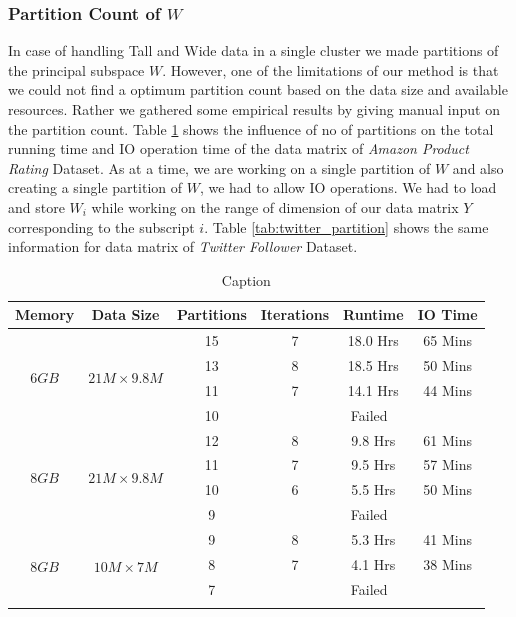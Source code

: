 \documentclass[10pt,conference,letterpaper]{IEEEtran}
\begin{document}
\subsubsection{Partition Count of $W$}
In case of handling Tall and Wide data in a single cluster we made partitions of the principal subspace $W$. However, one of the limitations of our method is that we could not find a optimum partition count based on the data size and available resources. Rather we gathered some empirical results by giving manual input on the partition count. Table \ref{tab:amazon_partition} shows the influence of no of partitions on the total running time and IO operation time of the data matrix of \textit{Amazon Product Rating} Dataset. As at a time, we are working on a single partition of $W$ and also creating a single partition of $W$, we had to allow IO operations. We had to load and store $W_i$ while working on 
the range of dimension of our data matrix $Y$ corresponding to the subscript $i$. Table \ref{tab:twitter_partition} shows the same information for data matrix of \textit{Twitter Follower} Dataset.

\begin{table}[!htbp]
    \centering
    \begin{tabular}{|c|c|c|c|c|c|}
    \hline
    Memory &Data Size &Partitions &Iterations &Runtime &IO Time \\
    \hline
    \multirow{4}{17pt}{$6GB$}  & \multirow{4}{7em}{$21M \times 9.8M$} &15  &7		&18.0 Hrs   	  &65 Mins\\
    \cline{3-6}
         & & 13 &8		&18.5 Hrs   	  &50 Mins\\
    \cline{3-6}
         & & 11 &7		&14.1 Hrs   	  &44 Mins\\
    \cline{3-6}
         & & 10 &\multicolumn{3}{|c|}{Failed} \\
    \hline
    
    \multirow{4}{17pt}{$8GB$}  & \multirow{4}{7em}{$21M \times 9.8M$} &12  &8		&9.8 Hrs   	  &61 Mins\\
    \cline{3-6}
         & & 11 &7		&9.5 Hrs     	  &57 Mins\\
    \cline{3-6}
         & & 10 &6		&5.5 Hrs   	  &50 Mins\\
    \cline{3-6}
         & & 9 &\multicolumn{3}{|c|}{Failed} \\
    \hline
    
    \multirow{4}{17pt}{$8GB$}  & \multirow{4}{7em}{$10M \times 7M$} &9  &8		 &5.3 Hrs   	  &41 Mins\\
    \cline{3-6}
         & & 8 &7		 &4.1 Hrs    	  &38 Mins\\
    \cline{3-6}
         & & 7 &\multicolumn{3}{|c|}{Failed} \\
    \hline
    \multicolumn{6}{c}{}
    \end{tabular}
    \caption{Caption}
    \label{tab:amazon_partition}
\end{table}
\end{document}
